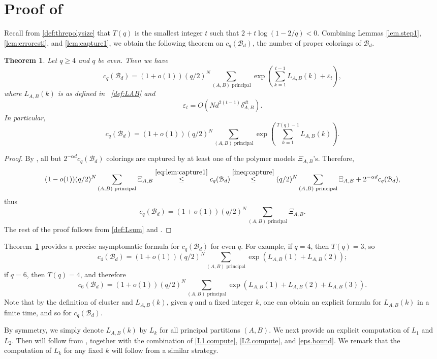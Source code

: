 \documentclass{amsart}
\newtheorem{thm}{Theorem}[section]
\theoremstyle{definition}
\newcommand{\bO}{O}
\newcommand{\thre}{T}
\newcommand{\cB}{\mathcal{B} }
\newcommand{\beq}[1]{\begin{equation}\label{#1}}
\newcommand{\enq}[0]{\end{equation}}
\newcommand{\0}[0]{\emptyset}
\begin{document}
\section{Proof of }\label{sec.realMT}
Recall from \eqref{def:threpolysize} that $T(q)$ is the smallest integer $t$ such that $2 + t\log(1 - 2/q)< 0$.
Combining Lemmas \ref{lem.step1}, \ref{lem:erroresti}, and \ref{lem:capture1}, we obtain the following theorem on $c_q(\cB_d)$, the number of proper colorings of $\cB_d$.
\begin{thm}\label{MT1'}
Let $q \ge 4$ and $q$ be even. Then we have 
\[
c_q(\cB_d) = (1 + o(1))(q/2)^{N} \sum_{(A, B) \text{ principal}}\exp\left(\sum_{k=1}^{t-1}L_{A, B}(k) + \varepsilon_t\right),
\]
where $L_{A, B}(k)$ is as defined in ~\eqref{def:LAB} and  
\beq{eps.bound} \varepsilon_t = \bO\left(Nd^{2(t-1)}\delta_{A, B}^{dt}\right).\enq
In particular, 
\[
c_q(\cB_d) = (1 + o(1))(q/2)^{N} \sum_{(A, B) \text{ principal}}\exp\left(\sum_{k=1}^{\thre(q)-1}L_{A, B}(k)\right).
\]
\end{thm}
\begin{proof}
By , all but $2^{-\alpha d}c_q(\cB_d)$ colorings are captured by at least one of the polymer models $\Xi_{A, B}$'s.
Therefore,
\[
(1-o(1))(q/2)^{N}\sum_{(A, B) \text{ principal}}\Xi_{A, B} \stackrel{\eqref{eq:lem:capture1}}{\leq} c_q(\cB_d) \stackrel{\eqref{ineq:capture}}{\leq} (q/2)^{N}\sum_{(A, B) \text{ principal}}\Xi_{A, B} + 2^{-\alpha d}c_q(\cB_d),
\]
thus
\[
c_q(\cB_d) = (1 + o(1))(q/2)^{N} \sum_{(A, B) \text{ principal}}\Xi_{A, B}.
\]
The rest of the proof follows from \eqref{def:Lsum} and .
\end{proof}

Theorem~\ref{MT1'} provides a precise asymptomatic formula for $c_q(\cB_d)$ for even $q$. For example, if $q=4$, then $\thre(q)=3$, so
\[
c_4(\cB_d) = (1 + o(1))(q/2)^{N} \sum_{(A, B) \text{ principal}}\exp\left(L_{A, B}(1) + L_{A, B}(2)\right);
\]
if $q=6$, then $\thre(q)=4$, and therefore
\[
c_6(\cB_d) = (1 + o(1))(q/2)^{N} \sum_{(A, B) \text{ principal}}\exp\left(L_{A, B}(1) + L_{A, B}(2) + L_{A, B}(3)\right).
\]
Note that by the definition of cluster and $L_{A, B}(k)$, given $q$ and a fixed integer $k$, one can obtain an explicit formula for $L_{A, B}(k)$ in a finite time, and so for $c_q(\cB_d)$.

By symmetry, we simply denote $L_{A, B}(k)$ by $L_k$ for all principal partitions $(A, B)$. We next provide an explicit computation of $L_1$ and $L_2$. Then  will follow from , together with the combination of \eqref{L1.compute}, \eqref{L2.compute}, and \eqref{eps.bound}. We remark that the computation of $L_k$ for any fixed $k$ will follow from a similar strategy.
\end{document}
